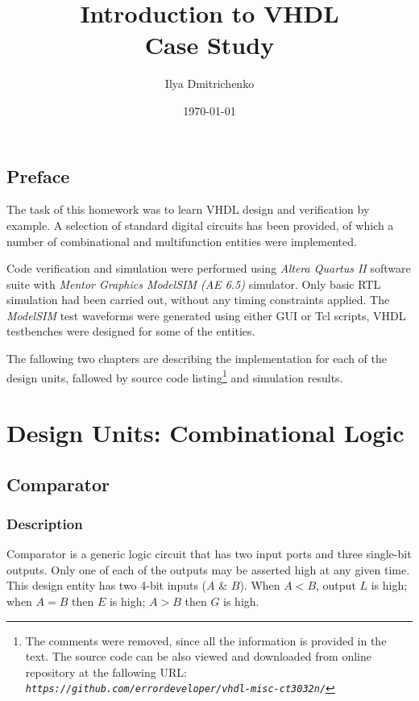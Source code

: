 \documentclass[10pt,a4paper]{report}
\author{Ilya Dmitrichenko}
\title{Introduction to VHDL \\ Case Study}
\date{\today}
\begin{document}
\maketitle

\section*{Preface}

 The task of this homework was to learn
 VHDL design and verification by example.
 A selection of standard digital circuits
 has been provided, of which a number
 of combinational and multifunction
 entities were implemented.

 Code verification and simulation were
 performed using \emph{Altera Quartus II}
 software suite with \emph{Mentor Graphics
 ModelSIM (AE 6.5)} simulator.
 Only basic RTL simulation had been
 carried out, without any timing constraints
 applied. The \emph{ModelSIM} test waveforms
 were generated using either GUI or Tcl scripts,
 VHDL testbenches were designed for some of
 the entities.

 The fallowing two chapters are describing
 the implementation for each of the design
 units, fallowed by source code listing\footnote{
 The comments were removed, since all the
 information is provided in the text. The
 source code can be also viewed and downloaded
 from online repository at the fallowing URL: \\
 \emph{\texttt{https://github.com/errordeveloper/vhdl-misc-ct3032n/}}}
 and simulation results.


\tableofcontents
\listoffigures

\chapter{Design Units: Combinational Logic}

\section{Comparator}

\subsection{Description}

 Comparator is a generic logic circuit that
 has two input ports and three single-bit
 outputs. Only one of each of the outputs
 may be asserted high at any given time.
 This design entity has two 4-bit inputs
 ($A$ \& $B$). When $A < B$, output $L$
 is high; when $A = B$ then $E$ is high;
 $A > B$ then $G$ is high.
\end{document}

